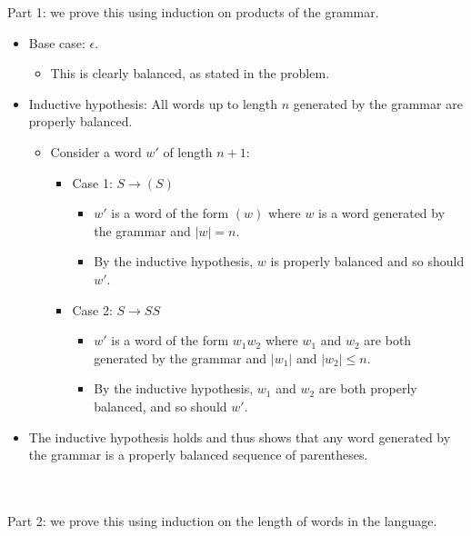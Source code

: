 \documentclass{article}
\begin{document}
\noindent Part 1: we prove this using induction on products of the grammar.
\begin{itemize}
    \item Base case: \(\epsilon\). 
    \begin{itemize}
        \item This is clearly balanced, as stated in the problem.
    \end{itemize}
    \item Inductive hypothesis: All words up to length \(n\) generated by the grammar are properly balanced.
    \begin{itemize}
        \item Consider a word \(w'\) of length \(n+1\):
        \begin{itemize}
            \item Case 1: \(S \to (S)\)
            \begin{itemize}
                \item \(w'\) is a word of the form \((w)\) where \(w\) is a word generated by the grammar and \(|w| = n\).
                \item By the inductive hypothesis, \(w\) is properly balanced and so should \(w'\).
            \end{itemize}
            \item Case 2: \(S \to SS\)
            \begin{itemize}
                \item \(w'\) is a word of the form \(w_1 w_2\) where \(w_1\) and \(w_2\) are both generated by the grammar and \(|w_1|\) and \(|w_2| \leq n\).
                \item By the inductive hypothesis, \(w_1\) and \(w_2\) are both properly balanced, and so should \(w'\).
            \end{itemize}
        \end{itemize}
    \end{itemize}
    \item The inductive hypothesis holds and thus shows that any word generated by the grammar is a properly balanced sequence of parentheses.
\end{itemize}
\\
\\\noindent Part 2: we prove this using induction on the length of words in the language.
\end{document}
